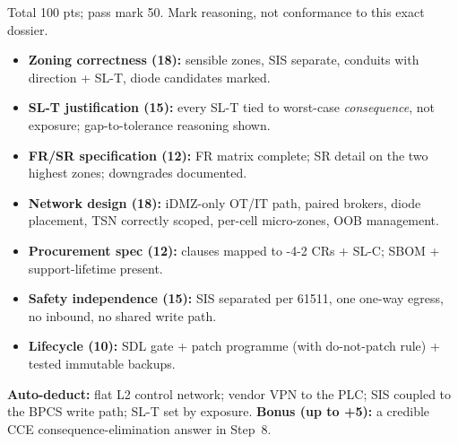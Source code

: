 \documentclass[11pt,a4paper]{article}
\begin{document}
\begin{rubricbox}
Total 100 pts; pass mark 50. Mark reasoning, not conformance to this
exact dossier.
\begin{itemize}\setlength{\itemsep}{1pt}
  \item \textbf{Zoning correctness (18):} sensible zones, SIS separate,
    conduits with direction + SL-T, diode candidates marked.
  \item \textbf{SL-T justification (15):} every SL-T tied to worst-case
    \emph{consequence}, not exposure; gap-to-tolerance reasoning shown.
  \item \textbf{FR/SR specification (12):} FR matrix complete; SR detail
    on the two highest zones; downgrades documented.
  \item \textbf{Network design (18):} iDMZ-only OT/IT path, paired
    brokers, diode placement, TSN correctly scoped, per-cell micro-zones,
    OOB management.
  \item \textbf{Procurement spec (12):} clauses mapped to -4-2 CRs +
    SL-C; SBOM + support-lifetime present.
  \item \textbf{Safety independence (15):} SIS separated per 61511, one
    one-way egress, no inbound, no shared write path.
  \item \textbf{Lifecycle (10):} SDL gate + patch programme (with
    do-not-patch rule) + tested immutable backups.
\end{itemize}
\textbf{Auto-deduct:} flat L2 control network; vendor VPN to the PLC;
SIS coupled to the BPCS write path; SL-T set by exposure. \textbf{Bonus
(up to +5):} a credible CCE consequence-elimination answer in Step~8.
\end{rubricbox}
\end{document}
